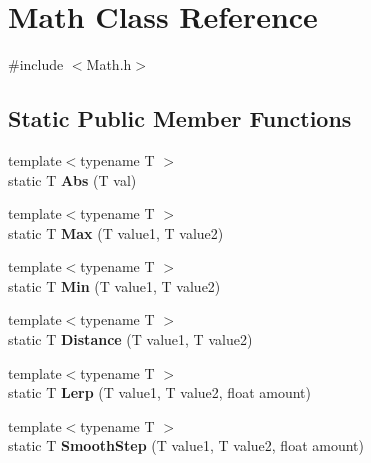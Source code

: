 \hypertarget{classMath}{}\section{Math Class Reference}
\label{classMath}


{\ttfamily \#include $<$Math.\+h$>$}

\subsection*{Static Public Member Functions}
\begin{DoxyCompactItemize}
\item 
\hypertarget{classMath_a96af82aa95382f06bb03b77ea4d12b97}{}{\footnotesize template$<$typename T $>$ }\\static T {\bfseries Abs} (T val)\label{classMath_a96af82aa95382f06bb03b77ea4d12b97}

\item 
\hypertarget{classMath_a58130e6975b437305c5865512beb907e}{}{\footnotesize template$<$typename T $>$ }\\static T {\bfseries Max} (T value1, T value2)\label{classMath_a58130e6975b437305c5865512beb907e}

\item 
\hypertarget{classMath_ad60f8423ebf30d2344e44fd2e0647b7b}{}{\footnotesize template$<$typename T $>$ }\\static T {\bfseries Min} (T value1, T value2)\label{classMath_ad60f8423ebf30d2344e44fd2e0647b7b}

\item 
\hypertarget{classMath_aec8ac4b0934a6f1c6ad60557d750a70e}{}{\footnotesize template$<$typename T $>$ }\\static T {\bfseries Distance} (T value1, T value2)\label{classMath_aec8ac4b0934a6f1c6ad60557d750a70e}

\item 
\hypertarget{classMath_a54159ad92ccae10fb8e4cb1b7e1ede0d}{}{\footnotesize template$<$typename T $>$ }\\static T {\bfseries Lerp} (T value1, T value2, float amount)\label{classMath_a54159ad92ccae10fb8e4cb1b7e1ede0d}

\item 
\hypertarget{classMath_af09efd8de760e53a9cbefd755848e908}{}{\footnotesize template$<$typename T $>$ }\\static T {\bfseries Smooth\+Step} (T value1, T value2, float amount)\label{classMath_af09efd8de760e53a9cbefd755848e908}


\end{DoxyCompactItemize}
